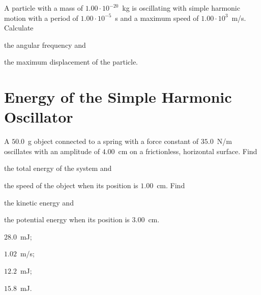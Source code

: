 \begin{problem}
	A particle with a mass of $1.00 \cdot 10^{-20}$~kg is oscillating with simple harmonic motion with a period of $1.00 \cdot 10^{-5}$~s and a maximum speed of $1.00 \cdot 10^3$~m/s. Calculate 
	\begin{enumerate*}[label=(\alph*)]
		\item the angular frequency and
		\item the maximum displacement of the particle.
	\end{enumerate*}
\end{problem}


\section{Energy of the Simple Harmonic Oscillator}


\begin{problem}
	A $50.0$~g object connected to a spring with a force constant of $35.0$~N/m oscillates with an amplitude of $4.00$~cm on a frictionless, horizontal surface. Find 
	\begin{enumerate*}[label=(\alph*)]
		\item the total energy of the system and
		\item the speed of the object when its position is $1.00$~cm.
		Find
		\item the kinetic energy and
		\item the potential energy when its position is $3.00$~cm.
	\end{enumerate*}
	\begin{solution}
		\begin{enumerate*}[label=(\alph*)]
			\item $28.0$~mJ; 
			\item $1.02$~m/s; 
			\item $12.2$~mJ;
			\item $15.8$~mJ.
		\end{enumerate*}
	\end{solution}
\end{problem}

